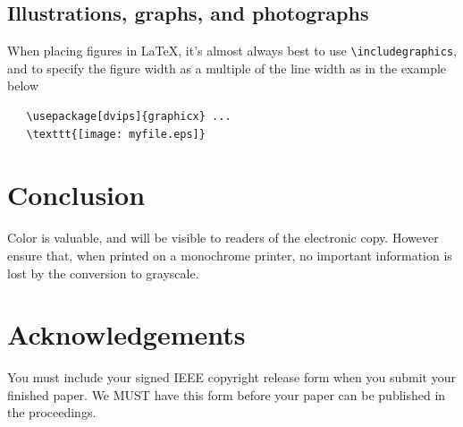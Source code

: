 \documentclass[10pt,twocolumn,letterpaper]{article}
\begin{document}
\subsection{Illustrations, graphs, and photographs}

When placing figures in \LaTeX, it's almost always best to use
\verb+\includegraphics+, and to specify the  figure width as a multiple of
the line width as in the example below
{\small\begin{verbatim}
   \usepackage[dvips]{graphicx} ...
   \texttt{[image: myfile.eps]}
\end{verbatim}
}


\section{Conclusion}

Color is valuable, and will be visible to readers of the electronic copy.
However ensure that, when printed on a monochrome printer, no important
information is lost by the conversion to grayscale.

\section{Acknowledgements}

You must include your signed IEEE copyright release form when you submit
your finished paper. We MUST have this form before your paper can be
published in the proceedings.


{\small


}
\end{document}
